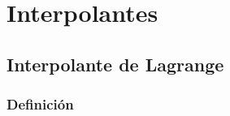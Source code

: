 \documentclass[12pt, fleqn]{report}                             %
\theoremstyle{break}                                            %
\begin{document}
            





\part{Interpolantes}
\clearpage



    \chapter{Interpolante de Lagrange}

        \clearpage
        \section{Definición}
\end{document}
